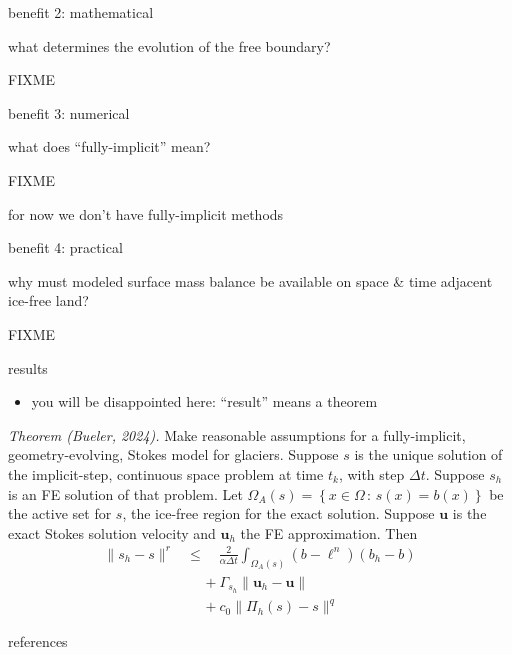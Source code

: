 \documentclass[10pt,dvipsnames]{beamer}
\newcommand{\bu}{\mathbf{u}}
\begin{document}
\begin{frame}{benefit 2: mathematical}

what determines the evolution of the free boundary?

\bigskip \bigskip

FIXME

\bigskip
{}
\end{frame}


\begin{frame}{benefit 3: numerical}

what does ``fully-implicit'' mean?

\bigskip \bigskip

FIXME

for now we don't have fully-implicit methods

\bigskip
{}
\end{frame}


\begin{frame}{benefit 4: practical}

why must modeled surface mass balance be available on space \& time adjacent ice-free land?

\bigskip \bigskip

FIXME
\end{frame}


\begin{frame}{results}

\begin{itemize}
\item you will be disappointed here: ``result'' means a theorem
\end{itemize}

\emph{Theorem (Bueler, 2024).}  Make reasonable assumptions for a fully-implicit, geometry-evolving, Stokes model for glaciers.  Suppose $s$ is the unique solution of the implicit-step, continuous space problem at time $t_k$, with step $\Delta t$.  Suppose $s_h$ is an FE solution of that problem.  Let $\Omega_A(s) = \left\{x\in\Omega\,:\,s(x)=b(x)\right\}$ be the active set for $s$, the ice-free region for the exact solution.  Suppose $\bu$ is the exact Stokes solution velocity and $\bu_h$ the FE approximation.  Then
\begin{align*}
\|s_h-s\|^r &\le \quad \frac{2}{\alpha \Delta t} \int_{\Omega_A(s)} (b - \ell^n) (b_h - b) \\
   &\quad\, + \Gamma_{s_h} \big\|\bu_h - \bu\big\| \\
   &\quad\, + c_0 \|\Pi_h(s) - s\|^q
\end{align*}
\end{frame}


\begin{frame}{references}

{\footnotesize }
\end{frame}
\end{document}
